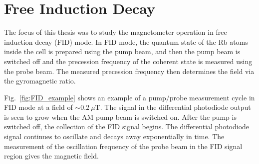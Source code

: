 






\section{Free Induction Decay\label{sec:FID}}

The focus of this thesis was to study the magnetometer operation in
free induction decay (FID) mode.  In FID mode, the quantum state of
the Rb atoms inside the cell is prepared using the pump beam, and then
the pump beam is switched off and the precession frequency of the
coherent state is measured using the probe beam.  The measured
precession frequency then determines the field via the gyromagnetic
ratio.

Fig.~\ref{fig:FID_example} shows an example of a pump/probe
measurement cycle in FID mode at a field of $\sim 0.2~\mu$T.  The
signal in the differential photodiode output is seen to grow when the
AM pump beam is switched on.  After the pump is switched off, the
collection of the FID signal begins.  The differential photodiode
signal continues to oscillate and decays away exponentially in time.
The measurement of the oscillation frequency of the probe beam in the
FID signal region gives the magnetic field.

